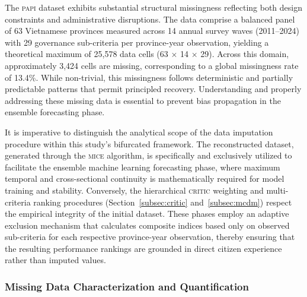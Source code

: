 \documentclass[12pt,a4paper]{article}
\newcommand{\PAPI}{\textsc{papi}\xspace}
\newcommand{\MICE}{\textsc{mice}\xspace}
\newcommand{\CRITIC}{\textsc{critic}\xspace}
\begin{document}

The \PAPI dataset exhibits substantial structural missingness reflecting both design constraints and administrative disruptions. The data comprise a balanced panel of 63 Vietnamese provinces measured across 14 annual survey waves (2011--2024) with 29 governance sub-criteria per province-year observation, yielding a theoretical maximum of 25,578 data cells (63 $\times$ 14 $\times$ 29). Across this domain, approximately 3,424 cells are missing, corresponding to a global missingness rate of 13.4\%. While non-trivial, this missingness follows deterministic and partially predictable patterns that permit principled recovery. Understanding and properly addressing these missing data is essential to prevent bias propagation in the ensemble forecasting phase.

It is imperative to distinguish the analytical scope of the data imputation procedure within this study's bifurcated framework. The reconstructed dataset, generated through the \MICE algorithm, is specifically and exclusively utilized to facilitate the ensemble machine learning forecasting phase, where maximum temporal and cross-sectional continuity is mathematically required for model training and stability. Conversely, the hierarchical \CRITIC weighting and multi-criteria ranking procedures (Section~\ref{subsec:critic} and~\ref{subsec:mcdm}) respect the empirical integrity of the initial dataset. These phases employ an adaptive exclusion mechanism that calculates composite indices based only on observed sub-criteria for each respective province-year observation, thereby ensuring that the resulting performance rankings are grounded in direct citizen experience rather than imputed values.

\subsubsection{Missing Data Characterization and Quantification}
\end{document}
